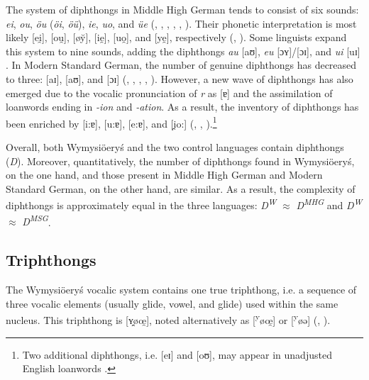 \documentclass[output=paper,hidelinks]{langscibook}
\begin{document}
The system of diphthongs in Middle High German tends to consist of six sounds: \textit{ei}, \textit{ou}, \textit{öu} (\textit{öi}, \textit{öü}), \textit{ie}, \textit{uo}, and \textit{üe} (\citealt[2--3, 5--6, 17]{wright_middle_1917}, \citealt[39--41, 45]{de_boor_mittelhochdeutsche_1973}, \citealt[1133]{simmler_phonetik_1985}, \citealt[62--63, 103--108]{paul_mittelhochdeutsche_2007}, \citealt[9]{hall_underlying_2017}, \citealt[69]{schmidt_einfuhrung_2017}). Their phonetic interpretation is most likely [ei̯], [ou̯], [ø\u{y}], [ie̯], [uo̯], and [ye̯], respectively (\citealt[103--108]{paul_mittelhochdeutsche_2007}, \citealt[9]{hall_underlying_2017}). Some linguists expand this system to nine sounds, adding the diphthongs \textit{au} [aʊ], \textit{eu} [ɔʏ]/[ɔɪ], and \textit{ui} [uɪ] \citep[185]{caratini_vocalic_2009}. In Modern Standard German, the number of genuine diphthongs has decreased to three: [aɪ], [aʊ], and [ɔɪ] (\citealt[354]{eisenberg_german_1994}, \citealt[4]{dodd_modern_2003}, \citealt[112--113]{johnson_exploring_2008}, \citealt[9]{fagan_german_2009}, \citealt[19]{obrein_german_2016}). However, a new wave of diphthongs has also emerged due to the vocalic pronunciation of \textit{r} as [ɐ] and the assimilation of loanwords ending in \textit{{}-ion} and \textit{{}-ation}. As a result, the inventory of diphthongs has been enriched by [i:ɐ], [u:ɐ], [e:ɐ], and [i̯̯o:] (\citealt[354]{eisenberg_german_1994}, \citealt[53--54]{fox_structure_2005}, \citealt[9]{fagan_german_2009}).\footnote{Two additional diphthongs, i.e. [eɪ] and [oʊ], may appear in unadjusted English loanwords \citep[73]{caratini_vocalic_2009}.}



Overall, both Wymysiöeryś and the two control languages contain diphthongs (\textit{D}). Moreover, quantitatively, the number of diphthongs found in Wymysiöeryś, on the one hand, and those present in Middle High German and Modern Standard German, on the other hand, are similar. As a result, the complexity of diphthongs is approximately equal in the three languages: \textit{D\textsuperscript{W}} ${\approx}$ \textit{D\textsuperscript{MHG} }and \textit{D\textsuperscript{W}} ${\approx}$ \textit{D\textsuperscript{MSG}}.


\subsection{Triphthongs}\label{sec:wymsorys:3.3}


The Wymysiöeryś vocalic system contains one true triphthong, i.e. a sequence of three vocalic elements (usually glide, vowel, and glide) used within the same nucleus. This triphthong is [ʏ̯øœ̯], noted alternatively as [\textsuperscript{y}øœ̯] or [\textsuperscript{y}øə] (\citealt[126]{andrason_szkic_2014}, \citealt[23]{andrason_grammar_2016}).
\end{document}
